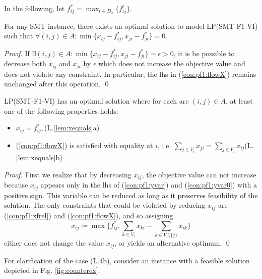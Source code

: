 In the following, let $f^*_{ij}=\max_{t\in D_0}\{f^t_{ij}\}$.
\begin{lemma}\label{lem:oneslack} For any SMT instance, there exists an optimal solution to model LP(SMT-F1-VI) such that 
$\forall (i,j)\in A: \min\{x_{ij} - f^*_{ij}, x_{ji}-f^*_{ji}\}=0$.
\end{lemma}
\begin{proof}
If $\exists (i,j)\in A: \min\{x_{ij} - f^*_{ij}, x_{ji}-f^*_{ji}\}=\epsilon>0$, it is be possible to decrease both $x_{ij}$ and $x_{ji}$ by $\epsilon$ which does not increase the objective value and does not violate any constraint. In particular, the lhs in (\ref{con:pf1:flowX}) remains unchanged after this operation.  \qed
\end{proof}
\begin{lemma}\label{lem:xequals} LP(SMT-F1-VI) has an optimal solution where for each arc $(i,j)\in A$, at least one of the following properties holds:

\begin{itemize}
\item\label{lem:item:noslack} $x_{ij}=f^*_{ij},$\hfill(L.\ref{lem:xequals}a)
\item\label{lem:item:slack} %
(\ref{con:pf1:flowX}) is satisfied with equality at $i$, i.e. $\sum_{j\in V_{i}}x_{ji}=\sum_{j\in V_i}x_{ij}$\hfill(L.\ref{lem:xequals}b)
\end{itemize}

\end{lemma}
\begin{proof}
First we realize that by decreasing $x_{ij}$, the objective value can not increase because $x_{ij}$ appears only in the lhs of (\ref{con:pf1:yvar}) and (\ref{con:pf1:yvar0}) with a positive sign. This variable can be reduced as long as it preserves feasibility of the solution. The only constraints that could be violated by reducing $x_{ij}$ are (\ref{con:pf1:xfrel}) and (\ref{con:pf1:flowX}), and so assigning 
$$x_{ij}\coloneqq\max\bigg\{ f^*_{ij},\sum_{k\in V_i}x_{ki}-\sum_{k\in V_i\setminus\{j\}}x_{ik}\bigg\}$$
either does not change the value $x_{ij}$, or yields an alternative optimum. \qed
\end{proof}
For clarification of the case (L.4b), consider an instance with a feasible solution depicted in Fig. \ref{fig:counterex}.
